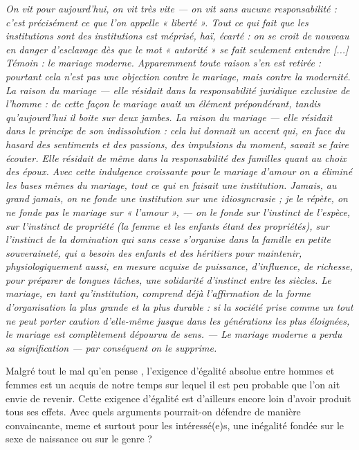 \begin{displayquote}
%
\emph{On vit pour aujourd'hui, on vit très vite --- on vit sans aucune responsabilité : c'est précisément ce que l'on appelle « liberté ». Tout ce qui fait que les institutions sont des institutions est méprisé, haï, écarté : on se croit de nouveau en danger d'esclavage dès que le mot « autorité » se fait seulement entendre \emph{[...]} Témoin : \emph{le mariage moderne}. Apparemment toute raison s'en est retirée : pourtant cela n'est pas une objection contre le mariage, mais contre la modernité. La raison du mariage --- elle résidait dans la responsabilité juridique exclusive de l'homme : de cette façon le mariage avait un élément prépondérant, tandis qu'aujourd'hui il boite sur deux jambes. La raison du mariage --- elle résidait dans le principe de son indissolution : cela lui donnait un accent qui, en face du hasard des sentiments et des passions, des impulsions du moment, \emph{savait se faire écouter}. Elle résidait de même dans la responsabilité des familles quant au choix des époux. Avec cette indulgence croissante pour le mariage \emph{d'amour} on a éliminé les bases mêmes du mariage, tout ce qui en faisait une institution. Jamais, au grand jamais, on ne fonde une institution sur une idiosyncrasie ; je le répète, on ne fonde pas le mariage sur « l'amour », --- on le fonde sur l'instinct de l'espèce, sur l'instinct de propriété (la femme et les enfants étant des propriétés), sur \emph{l'instinct de la domination} qui sans cesse s'organise dans la famille en petite souveraineté, qui a \emph{besoin} des enfants et des héritiers pour maintenir, physiologiquement aussi, en mesure acquise de puissance, d'influence, de richesse, pour préparer de longues tâches, une solidarité d'instinct entre les siècles. Le mariage, en tant qu'institution, comprend déjà l'affirmation de la forme d'organisation la plus grande et la plus durable : si la société prise comme un tout ne peut \emph{porter caution} d'elle-même jusque dans les générations les plus éloignées, le mariage est complètement dépourvu de sens. --- Le mariage moderne a perdu sa signification --- par conséquent on le supprime.}  
%
\end{displayquote}


 Malgré tout le mal qu'en pense , l'exigence d'égalité absolue entre hommes et femmes est un acquis de notre temps sur lequel il est peu probable que l'on ait envie de revenir. Cette exigence d'égalité est d'ailleurs encore loin d'avoir produit tous ses effets. Avec quels arguments pourrait-on défendre de manière convaincante, meme et surtout pour les intéressé(e)s, une inégalité fondée sur le sexe de naissance ou sur le genre ?
 
